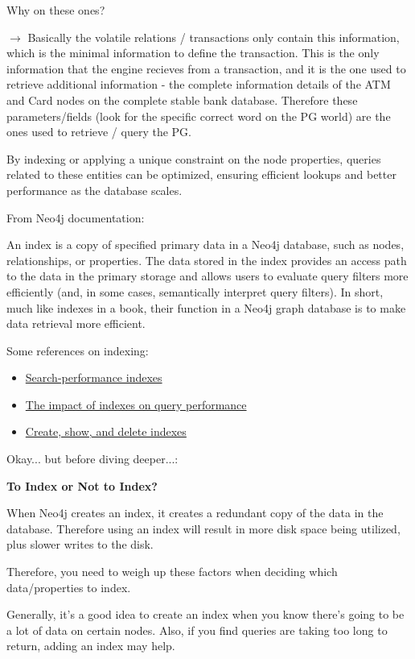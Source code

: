 \documentclass{article}
\begin{document}
Why on these ones?

$\rightarrow$ Basically the volatile relations / transactions only contain this information,
which is the minimal information to define the transaction. This is the only information that
the engine recieves from a transaction, and it is the one used to retrieve additional information - the complete information details of the ATM and Card nodes on the complete
stable bank database. Therefore these parameters/fields (look for the specific correct
word on the PG world) are the ones used to retrieve / query the PG. 

By indexing or applying a unique constraint on the node properties, queries related to these entities can be optimized, ensuring efficient lookups and better performance as the database scales.

From Neo4j documentation:
\begin{tcolorbox}
  An index is a copy of specified primary data in a Neo4j database, such as nodes, relationships, or properties. The data stored in the index provides an access path to the data in the primary storage and allows users to evaluate query filters more efficiently (and, in some cases, semantically interpret query filters). In short, much like indexes in a book, their function in a Neo4j graph database is to make data retrieval more efficient.
\end{tcolorbox}

Some references on indexing:
\begin{itemize}
  \item \href{https://neo4j.com/docs/cypher-manual/current/indexes/search-performance-indexes/overview/}{Search-performance indexes}
  \item \href{https://neo4j.com/docs/cypher-manual/current/indexes/search-performance-indexes/using-indexes/}{The impact of indexes on query performance}
  \item \href{https://neo4j.com/docs/cypher-manual/current/indexes/search-performance-indexes/managing-indexes/}{Create, show, and delete indexes}
\end{itemize}

Okay... but before diving deeper...:

\textbf{To Index or Not to Index?}
\begin{tcolorbox}
When Neo4j creates an index, it creates a redundant copy of the data in the database. Therefore using an index will result in more disk space being utilized, plus slower writes to the disk.

Therefore, you need to weigh up these factors when deciding which data/properties to index.

Generally, it's a good idea to create an index when you know there's going to be a lot of data on certain nodes. Also, if you find queries are taking too long to return, adding an index may help.
\end{tcolorbox}
\end{document}
